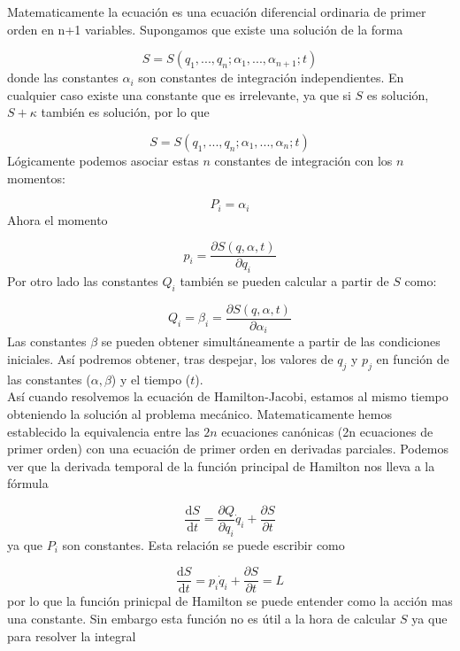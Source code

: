 \documentclass[12pt,a4paper]{article}
\numberwithin{equation}{section}
\numberwithin{figure}{section}
\newcommand{\parciales}[2]{\frac{\partial #1}{\partial #2}}
\newcommand{\D}{\mathrm{d}}
\newcommand{\derivadas}[2]{\frac{\D #1}{\D #2}}
\begin{document}
Matematicamente la ecuación es una ecuación diferencial ordinaria de primer orden en n+1 variables. Supongamos que existe una solución de la forma

$$ S = S(q_1,...,q_n;\alpha_1,...,\alpha_{n+1};t) $$
donde las constantes $\alpha_i$ son constantes de integración independientes. En cualquier caso existe una constante que es irrelevante, ya que si $S$ es solución, $S+\kappa$ también es solución, por lo que 

\begin{equation}
 S = S(q_1,...,q_n;\alpha_1,...,\alpha_{n};t) 
\end{equation}
Lógicamente podemos asociar estas $n$ constantes de integración con los $n$ momentos:

\begin{equation}
P_i = \alpha_i
\end{equation}
Ahora el momento

\begin{equation}
p_i = \parciales{S(q,\alpha,t)}{q_i}
\end{equation}
Por otro lado las constantes $Q_i$ también se pueden calcular a partir de $S$ como:

\begin{equation}
Q_i = \beta_i = \parciales{S(q,\alpha,t)}{\alpha_i}
\end{equation}
Las constantes $\beta$ se pueden obtener simultáneamente a partir de las condiciones iniciales. Así podremos obtener, tras despejar, los valores de $q_j$ y $p_j$ en función de las constantes ($\alpha,\beta$) y el tiempo ($t$). \\

Así cuando resolvemos la ecuación de Hamilton-Jacobi, estamos al mismo tiempo obteniendo la solución al problema mecánico. Matematicamente hemos establecido la equivalencia entre las $2n$ ecuaciones canónicas (2n ecuaciones de primer orden) con una ecuación de primer orden en derivadas parciales. Podemos ver que la derivada temporal de la función principal de Hamilton nos lleva a la fórmula

$$ \derivadas{S}{t} = \parciales{Q}{q_i} \dot{q}_i + \parciales{S}{t} $$
ya que $P_i$ son constantes. Esta relación se puede escribir como

\begin{equation}
\derivadas{S}{t} = p_i \dot{q}_i + \parciales{S}{t} = L
\end{equation}
por lo que la función prinicpal de Hamilton se puede entender como la acción mas una constante. Sin embargo esta función no es útil a la hora de calcular $S$ ya que para resolver la integral
\end{document}
